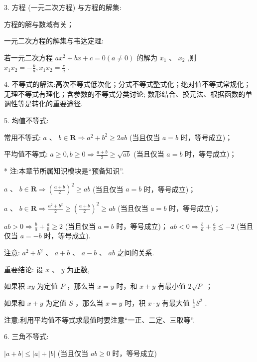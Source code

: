 3. 方程 (一元二次方程) 与方程的解集:

   方程的解与数域有关；

  一元二次方程的解集与韦达定理:

若一元二次方程 $a{x}^{2} + {bx} + c = 0\left( {a \neq  0}\right)$ 的解为 ${x}_{1}\text{ 、 }{x}_{2}$ ,则 ${x}_{1}{x}_{2} =  - \frac{b}{a},{x}_{1}{x}_{2} = \frac{c}{a}$ .

4. 不等式的解法:高次不等式低次化；分式不等式整式化；绝对值不等式常规化；无理不等式有理化；含参数的不等式分类讨论; 数形结合、换元法、根据函数的单调性等是转化的重要途径.

5. 均值不等式:

  常用不等式: $a$ 、 $b \in  \mathbf{R} \Rightarrow  {a}^{2} + {b}^{2} \geq  {2ab}$ (当且仅当 $a = b$ 时，等号成立)；

  平均值不等式: $a \geq  0,b \geq  0 \Rightarrow  \frac{a + b}{2} \geq  \sqrt{ab}$ (当且仅当 $a = b$ 时，等号成立)；

\HRule

* 注:本章节所属知识模块是“预备知识”.

\HRule

   $a\text{ 、 }b \in  \mathbf{R} \Rightarrow  {\left( \frac{a + b}{2}\right) }^{2} \geq  {ab}$ (当且仅当 $a = b$ 时，等号成立)；

   $a\text{ 、 }b \in  \mathbf{R} \Rightarrow  \frac{{a}^{2} + {b}^{2}}{2} \geq  {\left( \frac{a + b}{2}\right) }^{2} \geq  {ab}$ (当且仅当 $a = b$ 时，等号成立)；

   ${ab} > 0 \Rightarrow  \frac{b}{a} + \frac{a}{b} \geq  2$ (当且仅当 $a = b$ 时，等号成立)； ${ab} < 0 \Rightarrow  \frac{b}{a} + \frac{a}{b} \leq   - 2$ (当且仅当 $a =  - b$ 时，等号成立).

注意: ${a}^{2} + {b}^{2}\text{ 、 }a + b\text{ 、 }a - b\text{ 、 }{ab}$ 之间的关系.

重要结论: 设 $x\text{ 、 }y$ 为正数,

  如果积 ${xy}$ 为定值 $P$ ，那么当 $x = y$ 时，和 $x + y$ 有最小值 $2\sqrt{P}$ ；

  如果和 $x + y$ 为定值 $S$ ，那么当 $x = y$ 时，积 $x \cdot  y$ 有最大值 $\frac{1}{4}{S}^{2}$ .

注意:利用平均值不等式求最值时要注意“一正、二定、三取等”.

6. 三角不等式:

   $\left| {a + b}\right|  \leq  \left| a\right|  + \left| b\right|$ (当且仅当 ${ab} \geq  0$ 时，等号成立)

